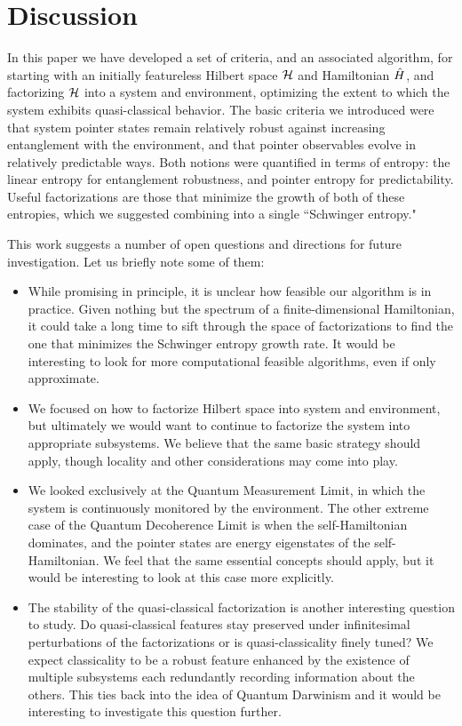 \documentclass[aps,pra,onecolumn,nofootinbib,notitlepage,11pt,tightenlines]{revtex4-1}
\begin{document}
\section{Discussion}

In this paper we have developed a set of criteria, and an associated algorithm, for starting with an initially featureless Hilbert space $\mathcal{H}$ and Hamiltonian $\hat{H}$, and factorizing $\mathcal{H}$ into a system and environment, optimizing the extent to which the system exhibits quasi-classical behavior. 
The basic criteria we introduced were that system pointer states remain relatively robust against increasing entanglement with the environment, and that pointer observables evolve in relatively predictable ways.
Both notions were quantified in terms of entropy: the linear entropy for entanglement robustness, and pointer entropy for predictability.
Useful factorizations are those that minimize the growth of both of these entropies, which we suggested combining into a single ``Schwinger entropy."

This work suggests a number of open questions and directions for future investigation.
Let us briefly note some of them:
\begin{itemize}
\item{While promising in principle, it is unclear how feasible our algorithm is in practice. Given nothing but the spectrum of a finite-dimensional Hamiltonian, it could take a long time to sift through the space of factorizations to find the one that minimizes the Schwinger entropy growth rate. It would be interesting to look for more computational feasible algorithms, even if only approximate.}
\item{We focused on how to factorize Hilbert space into system and environment, but ultimately we would want to continue to factorize the system into appropriate subsystems. We believe that the same basic strategy should apply, though locality and other considerations may come into play.}
\item{We looked exclusively at the Quantum Measurement Limit, in which the system is continuously monitored by the environment. The other extreme case of the Quantum Decoherence Limit is when the self-Hamiltonian dominates, and the pointer states are energy eigenstates of the self-Hamiltonian. We feel that the same essential concepts should apply, but it would be interesting to look at this case more explicitly.}
\item{The stability of the quasi-classical factorization is another interesting question to study. Do quasi-classical features stay preserved under infinitesimal perturbations of the factorizations or is quasi-classicality finely tuned? We expect classicality to be a robust feature enhanced by the existence of multiple subsystems each redundantly recording information about the others. This ties back into the idea of Quantum Darwinism \cite{riedel2012} and it would be interesting to investigate this question further. }
\end{itemize}
\end{document}
